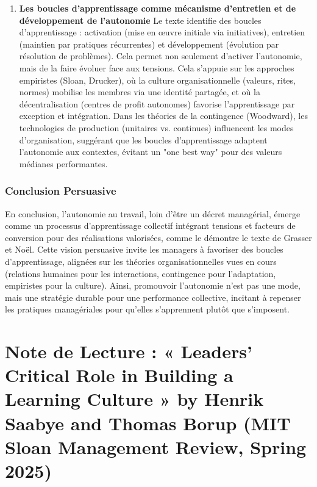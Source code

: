 \documentclass{rapportECL}
\begin{document}
\begin{enumerate}
\item \textbf{Les boucles d’apprentissage comme mécanisme d’entretien et de développement de l’autonomie}  
Le texte identifie des boucles d’apprentissage : activation (mise en œuvre initiale via initiatives), entretien (maintien par pratiques récurrentes) et développement (évolution par résolution de problèmes). Cela permet non seulement d’activer l’autonomie, mais de la faire évoluer face aux tensions. Cela s’appuie sur les approches empiristes (Sloan, Drucker), où la culture organisationnelle (valeurs, rites, normes) mobilise les membres via une identité partagée, et où la décentralisation (centres de profit autonomes) favorise l’apprentissage par exception et intégration. Dans les théories de la contingence (Woodward), les technologies de production (unitaires vs. continues) influencent les modes d’organisation, suggérant que les boucles d’apprentissage adaptent l’autonomie aux contextes, évitant un "one best way" pour des valeurs médianes performantes.
\end{enumerate}

\subsubsection{Conclusion Persuasive}
En conclusion, l’autonomie au travail, loin d’être un décret managérial, émerge comme un processus d’apprentissage collectif intégrant tensions et facteurs de conversion pour des réalisations valorisées, comme le démontre le texte de Grasser et Noël. Cette vision persuasive invite les managers à favoriser des boucles d’apprentissage, alignées sur les théories organisationnelles vues en cours (relations humaines pour les interactions, contingence pour l’adaptation, empiristes pour la culture). Ainsi, promouvoir l’autonomie n’est pas une mode, mais une stratégie durable pour une performance collective, incitant à repenser les pratiques managériales pour qu’elles s’apprennent plutôt que s’imposent.

\section{Note de Lecture : « Leaders’ Critical Role in Building a Learning Culture » by Henrik Saabye and Thomas Borup (MIT Sloan Management Review, Spring 2025)}
\end{document}
